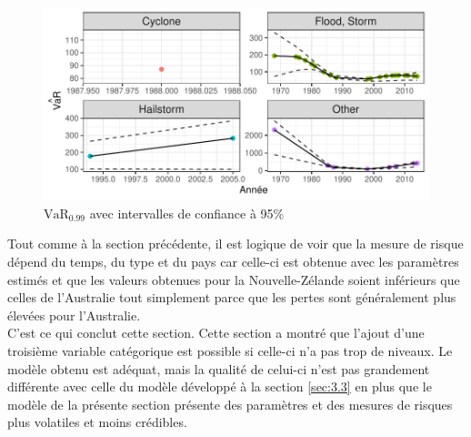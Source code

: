 \begin{figure}[h]
\begin{center}
\includegraphics{images/fig-032}
\end{center}
\caption{$\widehat{\text{VaR}_{0.99}}$ avec intervalles de confiance à 95\%}
\label{fig:3.19}
\end{figure}

Tout comme à la section précédente, il est logique de voir que la mesure de risque dépend du temps, du type et du pays car celle-ci est obtenue avec les paramètres estimés et que les valeurs obtenues pour la Nouvelle-Zélande soient inférieurs que celles de l'Australie tout simplement parce que les pertes sont généralement plus élevées pour l'Australie.
\\

C'est ce qui conclut cette section. Cette section a montré que l'ajout d'une troisième variable catégorique est possible si celle-ci n'a pas trop de niveaux. Le modèle obtenu est adéquat, mais la qualité de celui-ci n'est pas grandement différente avec celle du modèle développé à la section \ref{sec:3.3} en plus que le modèle de la présente section présente des paramètres et des mesures de risques plus volatiles et moins crédibles. 

